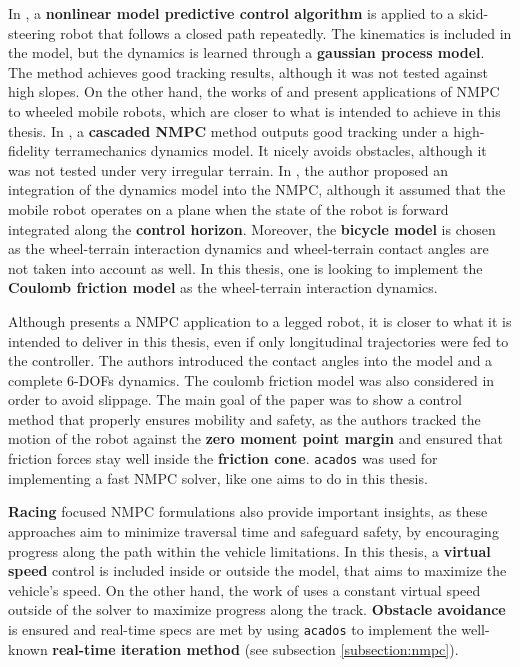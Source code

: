 In \cite{lbnmpcOstafew}, a \textbf{nonlinear model predictive control algorithm} is applied to a skid-steering robot that follows a closed path repeatedly. The kinematics is included in the model, but the dynamics is learned through a \textbf{gaussian process model}. The method achieves good tracking results, although it was not tested against high slopes. On the other hand, the works of \citet{binet2012model} and \citet{yu2022nmpc} present applications of NMPC to wheeled mobile robots, which are closer to what is intended to achieve in this thesis. In \cite{binet2012model}, a \textbf{cascaded NMPC} method outputs good tracking under a high-fidelity terramechanics dynamics model. It nicely avoids obstacles, although it was not tested under very irregular terrain. In \cite{yu2022nmpc}, the author proposed an integration of the dynamics model into the NMPC, although it assumed that the mobile robot operates on a plane when the state of the robot is forward integrated along the \textbf{control horizon}. Moreover, the \textbf{bicycle model} is chosen as the wheel-terrain interaction dynamics and wheel-terrain contact angles are not taken into account as well. In this thesis, one is looking to implement the \textbf{Coulomb friction model} as the wheel-terrain interaction dynamics.

Although \cite{rathod2021model} presents a NMPC application to a legged robot, it is closer to what it is intended to deliver in this thesis, even if only longitudinal trajectories were fed to the controller. The authors introduced the contact angles into the model and a complete 6-DOFs dynamics. The coulomb friction model was also considered in order to avoid slippage. The main goal of the paper was to show a control method that properly ensures mobility and safety, as the authors tracked the motion of the robot against the \textbf{zero moment point margin} and ensured that friction forces stay well inside the \textbf{friction cone}. \texttt{acados} \cite{verschueren2022acados} was used for implementing a fast NMPC solver, like one aims to do in this thesis.

\textbf{Racing} focused NMPC formulations \cite{liniger2015optimization, mpc_frenetserret} also provide important insights, as these approaches aim to minimize traversal time and safeguard safety, by encouraging progress along the path within the vehicle limitations. In this thesis, a \textbf{virtual speed} control is included inside or outside the model, that aims to maximize the vehicle's speed. On the other hand, the work of \citet{kloesernmpc} uses a constant virtual speed outside of the solver to maximize progress along the track. \textbf{Obstacle avoidance} is ensured and real-time specs are met by using \texttt{acados} to implement the well-known \textbf{real-time iteration method} (see subsection \ref{subsection:nmpc}).

